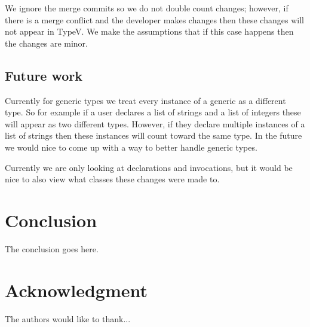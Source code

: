\documentclass[conference]{IEEEtran}
\begin{document}
We ignore the merge commits so we do not double count changes; however, if there is a merge conflict and the developer makes changes then these changes will not appear in TypeV. We make the assumptions that if this case happens then the changes are minor.

\subsection{Future work}

Currently for generic types we treat every instance of a generic as a different type. So for example if a user declares a list of strings and a list of integers these will appear as two different types. However, if they declare multiple instances of a list of strings then these instances will count toward the same type. In the future we would nice to come up with a way to better handle generic types.

Currently we are only looking at declarations and invocations, but it would be nice to also view what classes these changes were made to.

\section{Conclusion}
The conclusion goes here.






\section*{Acknowledgment}


The authors would like to thank...












\end{document}
